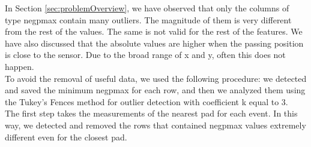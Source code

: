 \documentclass[conference]{IEEEtran}
\begin{document}
In Section \ref{sec:problemOverview}, we have observed that only the columns of type negpmax contain many outliers. The magnitude of them is very different from the rest of the values. The same is not valid for the rest of the features.
We have also discussed that the absolute values are higher when the passing position is close to the sensor. Due to the broad range of x and y, often this does not happen. \\ 
To avoid the removal of useful data, we used the following procedure: we detected and saved the minimum negpmax for each row, and then we analyzed them using the Tukey's Fences method for outlier detection with coefficient k equal to 3. \\
The first step takes the measurements of the nearest pad for each event. In this way, we detected and removed the rows that contained negpmax values extremely different even for the closest pad.
 
\end{document}
